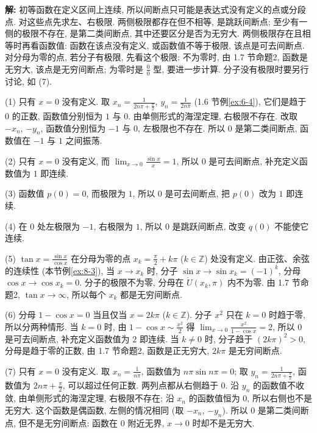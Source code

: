 \documentclass[UTF8,openany]{ctexbook}
\theoremstyle{chinesetextbook}
\newenvironment{cnsolution}{\par\indent\textbf{解:} \ignorespaces}{\par}
\begin{document}
\begin{cnsolution}
初等函数在定义区间上连续, 所以间断点只可能是表达式没有定义的点或分段点. 对这些点先求左、右极限. 两侧极限都存在但不相等, 是跳跃间断点; 至少有一侧的极限不存在, 是第二类间断点, 其中还要区分是否为无穷大. 两侧极限存在且相等时再看函数值: 函数在该点没有定义, 或函数值不等于极限, 该点是可去间断点. 对分母为零的点, 若分子有极限, 先看这个极限: 不为零时, 由 1.7 节命题2, 函数是无穷大, 该点是无穷间断点; 为零时是 $\displaystyle\frac00$ 型, 要进一步计算. 分子没有极限时要另行讨论, 如 (7).

(1) 只有 $x=0$ 没有定义. 取 $\displaystyle x_n=\frac1{2n\pi+\frac\pi2}$, $\displaystyle y_n=\frac1{2n\pi}$ (1.6 节例\ref{ex:6-4}), 它们是趋于 $0$ 的正数, 函数值分别恒为 $1$ 与 $0$. 由单侧形式的海涅定理, 右极限不存在. 改取 $-x_n$, $-y_n$, 函数值分别恒为 $-1$ 与 $0$, 左极限也不存在. 所以 $0$ 是第二类间断点, 函数值在 $-1$ 与 $1$ 之间振荡.

(2) 只有 $x=0$ 没有定义, 而 $\displaystyle\lim_{x\to0}\frac{\sin x}x=1$, 所以 $0$ 是可去间断点, 补充定义函数值为 $1$ 即连续.

(3) 函数值 $p(0)=0$, 而极限为 $1$, 所以 $0$ 是可去间断点, 把 $p(0)$ 改为 $1$ 即连续.

(4) 在 $0$ 处左极限为 $-1$, 右极限为 $1$, 所以 $0$ 是跳跃间断点, 改变 $q(0)$ 不能使它连续.

(5) $\displaystyle\tan x=\frac{\sin x}{\cos x}$ 在分母为零的点 $\displaystyle x_k=\frac\pi2+k\pi$ ($k\in\mathbb Z$) 处没有定义. 由正弦、余弦的连续性 (本节例\ref{ex:8-3}), 当 $x\to x_k$ 时, 分子 $\sin x\to\sin x_k=(-1)^k$, 分母 $\cos x\to\cos x_k=0$. 分子的极限不为零, 分母在 $\mathring U(x_k,\pi)$ 内不为零. 由 1.7 节命题2, $\tan x\to\infty$, 所以每个 $x_k$ 都是无穷间断点.

(6) 分母 $1-\cos x=0$ 当且仅当 $x=2k\pi$ ($k\in\mathbb Z$). 分子 $x^2$ 只在 $k=0$ 时趋于零, 所以分两种情形. 当 $k=0$ 时, 由 $\displaystyle1-\cos x\sim\frac{x^2}2$ 得 $\displaystyle\lim_{x\to0}\frac{x^2}{1-\cos x}=2$, 所以 $0$ 是可去间断点, 补充定义函数值为 $2$ 即连续. 当 $k\ne0$ 时, 分子趋于 $(2k\pi)^2>0$, 分母是趋于零的正数, 由 1.7 节命题2, 函数是正无穷大, $2k\pi$ 是无穷间断点.

(7) 只有 $x=0$ 没有定义. 取 $\displaystyle x_n=\frac1{n\pi}$, 函数值为 $n\pi\sin n\pi=0$; 取 $\displaystyle y_n=\frac1{2n\pi+\frac\pi2}$, 函数值为 $\displaystyle2n\pi+\frac\pi2$, 可以超过任何正数. 两列点都从右侧趋于 $0$. 沿 $y_n$ 的函数值不收敛, 由单侧形式的海涅定理, 右极限不存在; 沿 $x_n$ 的函数值恒为 $0$, 所以右侧也不是无穷大. 这个函数是偶函数, 左侧的情况相同 (取 $-x_n$, $-y_n$). 所以 $0$ 是第二类间断点, 但不是无穷间断点: 函数在 $0$ 附近无界, $x\to0$ 时却不是无穷大.
\end{cnsolution}
\end{document}

